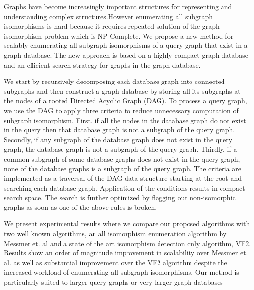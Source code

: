 
Graphs have become increasingly important structures for representing and understanding complex structures.However enumerating all subgraph isomorphisms is hard because it requires repeated solution of the graph isomorphism problem which is NP Complete.
We propose a new method for scalably enumerating all subgraph isomorphisms of a query graph that exist in a graph database. The new approach is based on a highly compact graph database and an efficient search strategy for graphs in the graph database.

We start by recursively decomposing each database graph into connected subgraphs and then construct a graph database by storing all its subgraphs at the nodes of a rooted Directed Acyclic Graph (DAG). To process a query graph, we use the DAG to apply three criteria to reduce unnecessary computation of subgraph isomorphism. First, if all the nodes in the database graph do not exist in the query then that database graph is not a subgraph of the query graph. Secondly, if any subgraph of the database graph does not exist in the query graph, the database graph is not a subgraph of the query graph. Thirdly, if a common subgraph of some database graphs does not exist in the query graph, none of the database graphs is a subgraph of the query graph. The criteria are implemented as a traversal of the DAG data structure starting at the root and searching each database graph. Application of the conditions results in compact search space. The search is further optimized by flagging out non-isomorphic graphs as soon as one of the above rules is broken. 

We present experimental results where we compare our proposed algorithms with two well known algorithms, an all isomorphism enumeration algorithm by Messmer et. al and a state of the art isomorphism detection only algorithm, VF2. Results show an order of magnitude improvement in scalability over Messmer et. al. as well as substantial improvement over the VF2 algorithm despite the increased workload of enumerating all subgraph isomorphisms. Our method is particularly suited to larger query graphs or very larger graph databases
